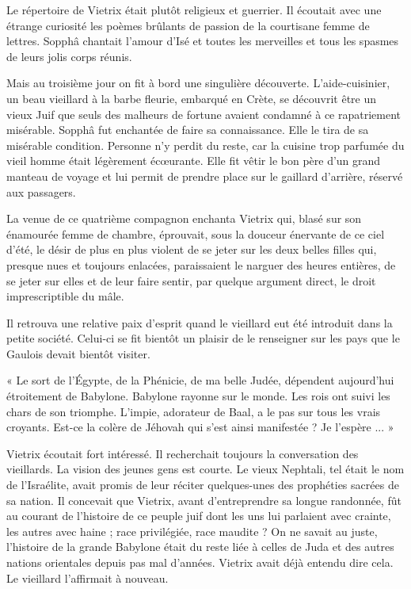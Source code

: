 \documentclass[a4paper, 11pt, oneside, polutonikogreek, french]{article}
\begin{document}
Le répertoire de Vietrix était plutôt religieux et guerrier. Il écoutait avec une étrange curiosité les poèmes brûlants de passion de la courtisane femme de lettres. Sopphâ chantait l'amour d'Isé et toutes les merveilles et tous les spasmes de leurs jolis corps réunis.

\bigskip
\centerline{\EightStarTaper}
\centerline{\EightStarTaper\EightStarTaper}
\bigskip

Mais au troisième jour on fit à bord une singulière découverte. L'aide-cuisinier, un beau vieillard à la barbe fleurie, embarqué en Crète, se découvrit être un vieux Juif que seuls des malheurs de fortune avaient condamné à ce rapatriement misérable. Sopphâ fut enchantée de faire sa connaissance. Elle le tira de sa misérable condition. Personne n'y perdit du reste, car la cuisine trop parfumée du vieil homme était légèrement écœurante. Elle fit vêtir le bon père d'un grand manteau de voyage et lui permit de prendre place sur le gaillard d'arrière, réservé aux passagers.

La venue de ce quatrième compagnon enchanta Vietrix qui, blasé sur son énamourée femme de chambre, éprouvait, sous la douceur énervante de ce ciel d'été, le désir de plus en plus violent de se jeter sur les deux belles filles qui, presque nues et toujours enlacées, paraissaient le narguer des heures entières, de se jeter sur elles et de leur faire sentir, par quelque argument direct, le droit imprescriptible du mâle.

\bigskip
\centerline{\EightStarTaper}
\centerline{\EightStarTaper\EightStarTaper}
\bigskip

Il retrouva une relative paix d'esprit quand le vieillard eut été introduit dans la petite société. Celui-ci se fit bientôt un plaisir de le renseigner sur les pays que le Gaulois devait bientôt visiter.

« Le sort de l'Égypte, de la Phénicie, de ma belle Judée, dépendent aujourd'hui étroitement de Babylone. Babylone rayonne sur le monde. Les rois ont suivi les chars de son triomphe. L'impie, adorateur de Baal, a le pas sur tous les vrais croyants. Est-ce la colère de Jéhovah qui s'est ainsi manifestée ? Je l'espère ... »

Vietrix écoutait fort intéressé. Il recherchait toujours la conversation des vieillards. La vision des jeunes gens est courte. Le vieux Nephtali, tel était le nom de l'Israélite, avait promis de leur réciter quelques-unes des prophéties sacrées de sa nation. Il concevait que Vietrix, avant d'entreprendre sa longue randonnée, fût au courant de l'histoire de ce peuple juif dont les uns lui parlaient avec crainte, les autres avec haine ; race privilégiée, race maudite ? On ne savait au juste, l'histoire de la grande Babylone était du reste liée à celles de Juda et des autres nations orientales depuis pas mal d'années. Vietrix avait déjà entendu dire cela. Le vieillard l'affirmait à nouveau.
\end{document}
